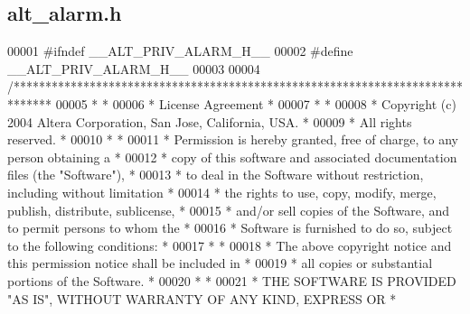 \subsection{alt\+\_\+alarm.\+h}
\label{priv_2alt__alarm_8h_source}

\begin{DoxyCode}
00001 \textcolor{preprocessor}{#ifndef \_\_ALT\_PRIV\_ALARM\_H\_\_}
00002 \textcolor{preprocessor}{#define \_\_ALT\_PRIV\_ALARM\_H\_\_}
00003 
00004 \textcolor{comment}{/******************************************************************************}
00005 \textcolor{comment}{*                                                                             *}
00006 \textcolor{comment}{* License Agreement                                                           *}
00007 \textcolor{comment}{*                                                                             *}
00008 \textcolor{comment}{* Copyright (c) 2004 Altera Corporation, San Jose, California, USA.           *}
00009 \textcolor{comment}{* All rights reserved.                                                        *}
00010 \textcolor{comment}{*                                                                             *}
00011 \textcolor{comment}{* Permission is hereby granted, free of charge, to any person obtaining a     *}
00012 \textcolor{comment}{* copy of this software and associated documentation files (the "Software"),  *}
00013 \textcolor{comment}{* to deal in the Software without restriction, including without limitation   *}
00014 \textcolor{comment}{* the rights to use, copy, modify, merge, publish, distribute, sublicense,    *}
00015 \textcolor{comment}{* and/or sell copies of the Software, and to permit persons to whom the       *}
00016 \textcolor{comment}{* Software is furnished to do so, subject to the following conditions:        *}
00017 \textcolor{comment}{*                                                                             *}
00018 \textcolor{comment}{* The above copyright notice and this permission notice shall be included in  *}
00019 \textcolor{comment}{* all copies or substantial portions of the Software.                         *}
00020 \textcolor{comment}{*                                                                             *}
00021 \textcolor{comment}{* THE SOFTWARE IS PROVIDED "AS IS", WITHOUT WARRANTY OF ANY KIND, EXPRESS OR  *}

\end{DoxyCode}

